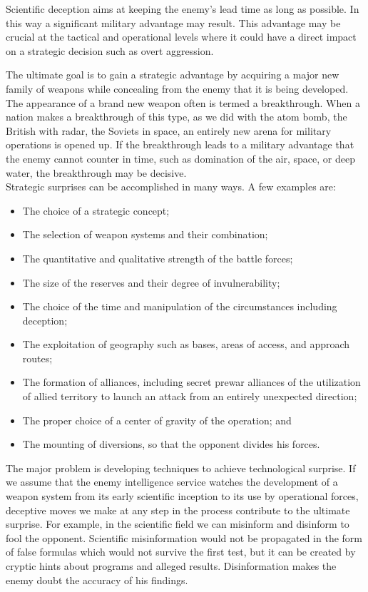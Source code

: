 Scientific deception aims at keeping the enemy's lead time as long as possible. In this way a significant military advantage may result. This advantage may be crucial at the tactical and operational levels where it could have a direct impact on a strategic decision such as overt aggression.

The ultimate goal is to gain a strategic advantage by acquiring a major new family of weapons while concealing from the enemy that it is being developed. The appearance of a brand new weapon often is termed a breakthrough. When a nation makes a breakthrough of this type, as we did with the atom bomb, the British with radar, the Soviets in space, an entirely new arena for military operations is opened up. If the breakthrough leads to a military advantage that the enemy cannot counter in time, such as domination of the air, space, or deep water, the breakthrough may be decisive.
\\
Strategic surprises can be accomplished in many ways. A few examples are:
\begin{itemize}
    \item The choice of a strategic concept;
    \item The selection of weapon systems and their combination;
    \item The quantitative and qualitative strength of the battle forces;
    \item The size of the reserves and their degree of invulnerability;
    \item The choice of the time and manipulation of the circumstances including deception;
    \item The exploitation of geography such as bases, areas of access, and approach routes;
    \item The formation of alliances, including secret prewar alliances of the utilization of allied territory to launch an attack from an entirely unexpected direction;
    \item The proper choice of a center of gravity of the operation; and
    \item The mounting of diversions, so that the opponent divides his forces.
\end{itemize}
The major problem is developing techniques to achieve technological surprise. If we assume that the enemy intelligence service watches the development of a weapon system from its early scientific inception to its use by operational forces, deceptive moves we make at any step in the process contribute to the ultimate surprise. For example, in the scientific field we can misinform and disinform to fool the opponent. Scientific misinformation would not be propagated in the form of false formulas which would not survive the first test, but it can be created by cryptic hints about programs and alleged results. Disinformation makes the enemy doubt the accuracy of his findings.

